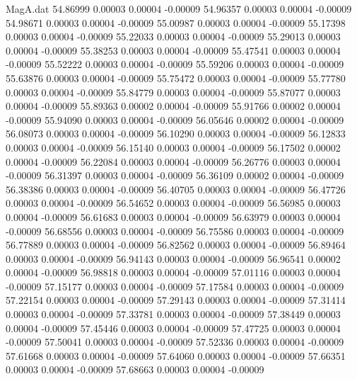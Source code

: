 \begin{filecontents}{MagA.dat}
  54.86999    0.00003    0.00004   -0.00009
  54.96357    0.00003    0.00004   -0.00009
  54.98671    0.00003    0.00004   -0.00009
  55.00987    0.00003    0.00004   -0.00009
  55.17398    0.00003    0.00004   -0.00009
  55.22033    0.00003    0.00004   -0.00009
  55.29013    0.00003    0.00004   -0.00009
  55.38253    0.00003    0.00004   -0.00009
  55.47541    0.00003    0.00004   -0.00009
  55.52222    0.00003    0.00004   -0.00009
  55.59206    0.00003    0.00004   -0.00009
  55.63876    0.00003    0.00004   -0.00009
  55.75472    0.00003    0.00004   -0.00009
  55.77780    0.00003    0.00004   -0.00009
  55.84779    0.00003    0.00004   -0.00009
  55.87077    0.00003    0.00004   -0.00009
  55.89363    0.00002    0.00004   -0.00009
  55.91766    0.00002    0.00004   -0.00009
  55.94090    0.00003    0.00004   -0.00009
  56.05646    0.00002    0.00004   -0.00009
  56.08073    0.00003    0.00004   -0.00009
  56.10290    0.00003    0.00004   -0.00009
  56.12833    0.00003    0.00004   -0.00009
  56.15140    0.00003    0.00004   -0.00009
  56.17502    0.00002    0.00004   -0.00009
  56.22084    0.00003    0.00004   -0.00009
  56.26776    0.00003    0.00004   -0.00009
  56.31397    0.00003    0.00004   -0.00009
  56.36109    0.00002    0.00004   -0.00009
  56.38386    0.00003    0.00004   -0.00009
  56.40705    0.00003    0.00004   -0.00009
  56.47726    0.00003    0.00004   -0.00009
  56.54652    0.00003    0.00004   -0.00009
  56.56985    0.00003    0.00004   -0.00009
  56.61683    0.00003    0.00004   -0.00009
  56.63979    0.00003    0.00004   -0.00009
  56.68556    0.00003    0.00004   -0.00009
  56.75586    0.00003    0.00004   -0.00009
  56.77889    0.00003    0.00004   -0.00009
  56.82562    0.00003    0.00004   -0.00009
  56.89464    0.00003    0.00004   -0.00009
  56.94143    0.00003    0.00004   -0.00009
  56.96541    0.00002    0.00004   -0.00009
  56.98818    0.00003    0.00004   -0.00009
  57.01116    0.00003    0.00004   -0.00009
  57.15177    0.00003    0.00004   -0.00009
  57.17584    0.00003    0.00004   -0.00009
  57.22154    0.00003    0.00004   -0.00009
  57.29143    0.00003    0.00004   -0.00009
  57.31414    0.00003    0.00004   -0.00009
  57.33781    0.00003    0.00004   -0.00009
  57.38449    0.00003    0.00004   -0.00009
  57.45446    0.00003    0.00004   -0.00009
  57.47725    0.00003    0.00004   -0.00009
  57.50041    0.00003    0.00004   -0.00009
  57.52336    0.00003    0.00004   -0.00009
  57.61668    0.00003    0.00004   -0.00009
  57.64060    0.00003    0.00004   -0.00009
  57.66351    0.00003    0.00004   -0.00009
  57.68663    0.00003    0.00004   -0.00009

\end{filecontents}
